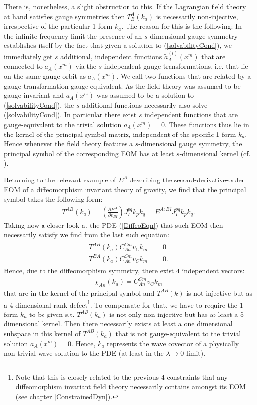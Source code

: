 There is, nonetheless, a slight obstruction to this. If the Lagrangian field theory at hand satisfies gauge symmetries then $T^A_B(k_a)$ is necessarily non-injective, irrespective of the particular 1-form $k_a$. The reason for this is the following: In the infinite frequency limit the presence of an $s$-dimensional gauge symmetry establishes itself by the fact that given a solution to (\ref{solvabilityCond}), we immediately get $s$ additional, independent functions $\tilde{a}^{(i)}_A(x^m)$ that are connected to $a_A(x^m)$ via the $s$ independent gauge transformations, i.e. that lie on the same gauge-orbit as $a_A(x^m)$. We call two functions that are related by a gauge transformation gauge-equivalent. As the field theory was assumed to be gauge invariant and $a_A(x^m)$ was assumed to be a solution to (\ref{solvabilityCond}), the $s$ additional functions necessarily also solve (\ref{solvabilityCond}). In particular there exist $s$ independent functions that are gauge-equivalent to the trivial solution $a_A(x^m) = 0$.    
These functions thus lie in the kernel of the principal symbol matrix, independent of the specific 1-form $k_a$.
Hence whenever the field theory features a $s$-dimensional gauge symmetry, the principal symbol of the corresponding EOM has at least $s$-dimensional kernel (cf. \cite{2018PhRvD..97h4036D}). 

Returning to the relevant example of $E^A$ describing the second-derivative-order EOM of a diffeomorphism invariant theory of gravity, we find that the principal symbol takes the following form:
\begin{align}
    T^{A B} (k_a) = \left (\frac{\partial E^A}{\partial v_{BI}} \right )J_I^{pq} k_p k_q = E^{A: BI} J_I^{pq} k_p k_q.
\end{align}
Taking now a closer look at the PDE (\ref{DiffeoEqn}) that such EOM then necessarily  satisfy we find from the last such equation:
\begin{align}\label{symbolDef}
\begin{aligned}
    T^{A B} (k_a) C_{An}^{Cm}v_Ck_m &= 0 \\
    T^{B A} (k_a) C_{An}^{Cm}v_Ck_m &= 0 .
\end{aligned}
\end{align}
Hence, due to the diffeomorphism symmetry, there exist $4$ independent vectors:
\begin{align}
   \chi_{An}(k_a) =  C_{An}^{Cm}v_Ck_m
\end{align} that are in the kernel of the principal symbol and $T^{AB}(k)$ is not injective but as a 4-dimensional rank defect\footnote{Note that this is closely related to the previous $4$ constraints that any diffeomorphism invariant field theory necessarily contains amongst its EOM (see chapter \ref{ConstrainedDyn}).}. To compensate for that, we have to require the 1-form $k_a$ to be given s.t. $T^{AB}(k_a)$ is not only non-injective but has at least a 5-dimensional kernel. Then there necessarily exists at least a one dimensional subspace in this kernel of $T^{AB}(k_a)$ that is not gauge-equivalent to the trivial solution $a_A(x^m) = 0$. Hence, $k_a$ represents the wave covector of a physically non-trivial wave solution to the PDE (at least in the $\lambda \rightarrow 0$ limit).


